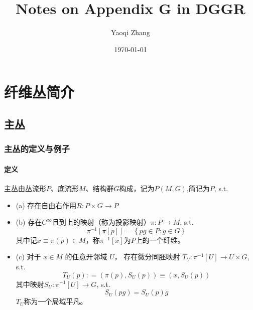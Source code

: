 \documentclass{ctexbook}
\title{Notes on Appendix G in DGGR }
\author{Yaoqi Zhang}
\date{\today}
\begin{document}
\maketitle

\pagestyle{empty} %

\tableofcontents %

\cleardoublepage %


\part{纤维丛简介}
\chapter{主丛}

\section{主丛的定义与例子}

\subsection{定义}

主丛由丛流形$P$、底流形$M$、结构群$G$构成，记为$P(M,G)$,简记为$P$,  s.t.

\begin{itemize}
    \item (a) 存在自由右作用$R\colon P\times G\to P$
    \item (b) 存在$C^{\infty}$且到上的映射（称为投影映射）$\pi\colon P\to M$, s.t.
    \begin{equation}
        \pi^{-1}[\pi[p]]=\left\{pg\in P\colon g\in G\right\}
    \end{equation}
    其中记$x\equiv\pi(p)\in M$，称$\pi^{-1}[x]$为$P$上的一个纤维。
    \item (c) 对于 $x\in M$ 的任意开邻域 $U$， 存在微分同胚映射 $T_{U}\colon \pi^{-1}[U]\to U\times G$, s.t.
    \begin{equation}
        T_{U}(p)\colon =(\pi(p),S_{U}(p))\equiv(x,S_{U}(p))
    \end{equation}
    其中映射$S_{U}\colon \pi^{-1}[U]\to G$, s.t.
    \begin{equation}
        S_{U}(pg)=S_{U}(p)g
    \end{equation}
    $T_{U}$称为一个局域平凡。
\end{itemize}
\end{document}
